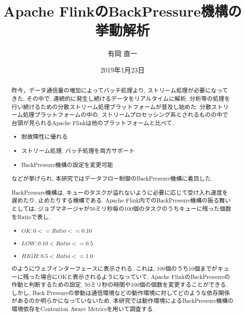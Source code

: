\documentclass[11pt]{jreport}
\title{Apache FlinkのBackPressure機構の挙動解析}
\author{有岡 直一}
\date{2019年1月23日}	%
\begin{document}
\maketitle

\begin{abstract}
昨今，データ通信量の増加によってバッチ処理より, ストリーム処理が必要になってきた. 
その中で, 連続的に発生し続けるデータをリアルタイムに解析, 分析等の処理を行い続けるための分散ストリーム処理プラットフォームが普及し始めた. 
分散ストリーム処理プラットフォームの中の, ストリームプロセッシング系とされるものの中で台頭が見られるApache Flinkは他のプラットフォームと比べて, 
\begin{itemize}
  \item 耐故障性に優れる
  \item ストリーム処理, バッチ処理を両方サポート
  \item BackPressure機構の設定を変更可能
  \end{itemize}
 などが挙げられ, 本研究ではデータフロー制御のBackPressure機構に着目した.
 
 BackPressure機構は, キューのタスクが溢れないように必要に応じて受け入れ速度を遅めたり, 止めたりする機構である. 
 Apache Flink内でのBackPressure機構の振る舞いとしては, ジョブマネージャが50ミリ秒毎の100個のタスクのうちキューに残った個数をRatioで表し, 
\begin{itemize}
  \item $OK: 0 <= Ratio <= 0.10$
  \item $LOW: 0.10 < Ratio <= 0.5$
  \item $HIGH: 0.5 < Ratio <= 1.0$
  \end{itemize}
  のようにウェブインターフェースに表示される. 
 これは, 100個のうち10個までがキューに残った場合にOKと表示されるようになっていて, Apache FlinkのBackPressureの作動と判断するための設定, 50ミリ秒の時間や100個の個数を変更することができる. 
 しかし, Back Pressureの挙動は通信環境などの動作環境に対してどのような依存関係があるのか明らかになっていないため, 
 本研究では動作環境によるBackPressure機構の環境依存をContention Aware Metricsを用いて調査する. 


\end{abstract}
\end{document}
